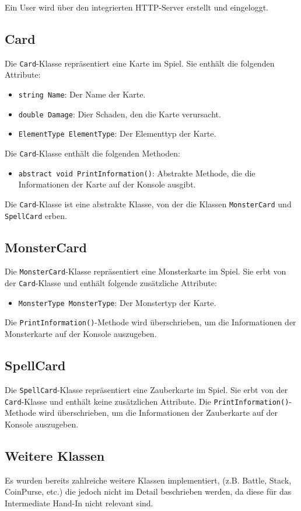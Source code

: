 \documentclass[a4paper, 12pt]{article}
\begin{document}
Ein User wird über den integrierten HTTP-Server erstellt und eingeloggt.

\subsection{Card}
Die \texttt{Card}-Klasse repräsentiert eine Karte im Spiel. Sie enthält die folgenden Attribute:
\begin{itemize}
    \item \texttt{string Name}: Der Name der Karte.
    \item \texttt{double Damage}: Dier Schaden, den die Karte verursacht.
    \item \texttt{ElementType ElementType}: Der Elementtyp der Karte.
\end{itemize}

Die \texttt{Card}-Klasse enthält die folgenden Methoden:
\begin{itemize}
    \item \texttt{abstract void PrintInformation()}: Abstrakte Methode, die die Informationen der Karte auf der Konsole ausgibt.
\end{itemize}

Die \texttt{Card}-Klasse ist eine abstrakte Klasse, von der die Klassen \texttt{MonsterCard} und \texttt{SpellCard} erben.
\subsection{MonsterCard}
Die \texttt{MonsterCard}-Klasse repräsentiert eine Monsterkarte im Spiel. Sie erbt von der \texttt{Card}-Klasse und enthält folgende zusätzliche Attribute:
\begin{itemize}
    \item \texttt{MonsterType MonsterType}: Der Monstertyp der Karte.
\end{itemize}
Die \texttt{PrintInformation()}-Methode wird überschrieben, um die Informationen der Monsterkarte auf der Konsole auszugeben.

\subsection{SpellCard}
Die \texttt{SpellCard}-Klasse repräsentiert eine Zauberkarte im Spiel. Sie erbt von der \texttt{Card}-Klasse und enthält keine zusätzlichen Attribute.
Die \texttt{PrintInformation()}-Methode wird überschrieben, um die Informationen der Zauberkarte auf der Konsole auszugeben.

\subsection{Weitere Klassen}
Es wurden bereits zahlreiche weitere Klassen implementiert, (z.B. Battle, Stack, CoinPurse, etc.) die jedoch nicht im Detail beschrieben werden, da diese für das Intermediate Hand-In nicht relevant sind.
\end{document}
